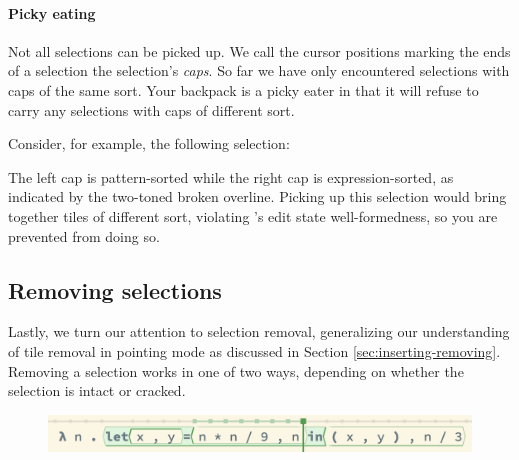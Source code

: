 

\paragraph{Picky eating}
Not all selections can be picked up.
We call the cursor positions marking the ends of a selection
the selection's \emph{caps}.
So far we have only encountered selections with caps
of the same sort.
Your backpack is a picky eater in that
it will refuse to carry any selections with caps of
different sort.

Consider, for example, the following selection:


\noindent
The left cap is pattern-sorted while the right cap
is expression-sorted, as indicated by the two-toned
broken overline.
Picking up this selection would bring together
tiles of different sort, violating \tylr's edit
state well-formedness, so you are prevented from doing so.



\subsection{Removing selections}

Lastly, we turn our attention to selection removal,
generalizing our understanding of tile removal
in pointing mode as discussed in
Section \ref{sec:inserting-removing}.
Removing a selection works in one of two ways,
depending on whether the selection is intact or cracked.

\begin{figure}[h]
  \centering
  \includegraphics[width=\columnwidth]{img/test-wide.png}
\end{figure}

